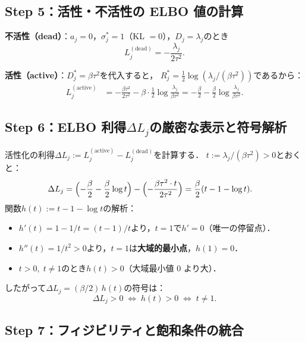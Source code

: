 \documentclass[11pt,a4paper]{jsarticle}
\begin{document}
\subsection*{Step 5：活性・不活性の ELBO 値の計算}

\textbf{不活性（dead）}：$a_j = 0$，$\sigma_j^* = 1$（KL $= 0$），$D_j = \lambda_j$のとき
\begin{equation}
  L_j^{(\mathrm{dead})} = -\frac{\lambda_j}{2\tau^2}.
  \label{eq:Lj_dead}
\end{equation}

\textbf{活性（active）}：$D_j^* = \beta\tau^2$を代入すると，
$R_j^* = \tfrac{1}{2}\log(\lambda_j / (\beta\tau^2))$であるから：
\begin{align}
  L_j^{(\mathrm{active})}
  &= -\frac{\beta\tau^2}{2\tau^2} - \beta \cdot \frac{1}{2}\log\frac{\lambda_j}{\beta\tau^2}
   = -\frac{\beta}{2} - \frac{\beta}{2}\log\frac{\lambda_j}{\beta\tau^2}.
  \label{eq:Lj_active}
\end{align}

\subsection*{Step 6：ELBO 利得$\Delta L_j$の厳密な表示と符号解析}

活性化の利得$\Delta L_j := L_j^{(\mathrm{active})} - L_j^{(\mathrm{dead})}$を計算する．
$t := \lambda_j / (\beta\tau^2) > 0$とおくと：
\begin{align}
  \Delta L_j
  &= \Bigl(-\frac{\beta}{2} - \frac{\beta}{2}\log t\Bigr) - \Bigl(-\frac{\beta\tau^2 \cdot t}{2\tau^2}\Bigr)
   = \frac{\beta}{2}(t - 1 - \log t).
  \label{eq:delta_L_exact}
\end{align}
関数$h(t) := t - 1 - \log t$の解析：
\begin{itemize}
  \item $h'(t) = 1 - 1/t = (t-1)/t$より，$t=1$で$h'=0$（唯一の停留点）．
  \item $h''(t) = 1/t^2 > 0$より，$t=1$は\textbf{大域的最小点}，$h(1) = 0$．
  \item $t > 0,\; t \neq 1$のとき$h(t) > 0$（大域最小値 0 より大）．
\end{itemize}
したがって$\Delta L_j = (\beta/2)\,h(t)$の符号は：
\begin{equation}
  \Delta L_j > 0
  \;\Longleftrightarrow\;
  h(t) > 0
  \;\Longleftrightarrow\;
  t \neq 1.
  \label{eq:delta_sign}
\end{equation}

\subsection*{Step 7：フィジビリティと飽和条件の統合}
\end{document}
